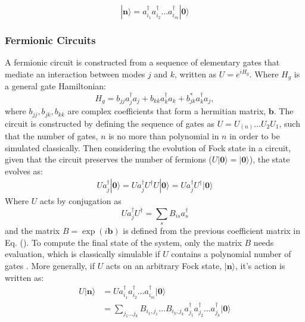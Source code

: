 \begin{equation}
    |{\mathbf n}\rangle = a_{i_1}^{\dagger} a_{i_2}^{\dagger}\dots a_{i_m}^{\dagger}|{\mathbf 0}\rangle
\end{equation}

\subsubsection{Fermionic Circuits}
A fermionic circuit is constructed from a sequence of elementary gates that mediate an interaction between
modes $j$ and $k$, written as $U = e^{iH_g}$. Where $H_g$ is a general gate Hamiltonian:
\begin{equation}\label{gateham}
    H_g = b_{jj}a_j^{\dagger}a_j + b_{kk} a_{k}^{\dagger}a_{k} + b^{*}_{jk}a_k^{\dagger}a_j,
\end{equation}
where $b_{jj}, b_{jk}, b_{kk}$ are complex coefficients that form a hermitian matrix, $\mathbf b$.
The circuit is constructed by defining the
sequence of gates as $U = U_{(n)} \dots U_2 U_1$, such that the number of gates, $n$ is no more than 
polynomial in $n$ in order to be simulated classically. Then considering the evolution of Fock state in a circuit, given that the
circuit preserves the number of fermions ($U|{\mathbf 0}\rangle = |{\mathbf 0}\rangle  $), the state evolves as:
\begin{align}
    U a_j^{\dagger} |{\mathbf 0}\rangle = U a_j^{\dagger} U^{\dagger}U |{\mathbf 0}\rangle = U a_j^{\dagger} U^{\dagger} |{\mathbf 0}\rangle
\end{align}
Where $U$ acts by conjugation as
\begin{equation}
    U a_j^{\dagger} U^{\dagger} = \sum_s B_{is} a_s^{\dagger}
\end{equation}
and the matrix $B = \exp(i{\mathbf b})$ is defined from the previous coefficient matrix in Eq. ().
To compute the final state of the system, only the matrix $B$ needs evaluation, which is classically simulable if $U$ contains
a polynomial number of gates \cite{Terhal2001}. More generally, if $U$ acts on an arbitrary Fock state, $|{\mathbf n}\rangle$, it's action
is written as:
\begin{align}
    U |{\mathbf n}\rangle & = U a_{i_1}^{\dagger} a_{i_2}^{\dagger}\dots a_{i_m}^{\dagger}|{\mathbf 0}\rangle                                                    \\
                          & = \sum_{j_1 \dots j_k} B_{i_1, j_1} \dots B_{i_k, j_k} a_{j_1}^{\dagger} a_{j_2}^{\dagger}\dots a_{j_k}^{\dagger}|{\mathbf 0}\rangle
\end{align}
